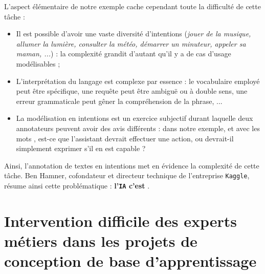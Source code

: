 		L'aspect élémentaire de notre exemple cache cependant toute la difficulté de cette tâche :
		\begin{itemize}
			\item Il est possible d'avoir une vaste diversité d'intentions (\textit{jouer de la musique, allumer la lumière, consulter la météo, démarrer un minuteur, appeler sa maman, ...}) : la complexité grandit d'autant qu'il y a de cas d'usage modélisables ;
			\item L'interprétation du langage est complexe par essence : le vocabulaire employé peut être spécifique, une requête peut être ambiguë ou à double sens, une erreur grammaticale peut gêner la compréhension de la phrase, ...
			\item La modélisation en intentions est un exercice subjectif durant laquelle deux annotateurs peuvent avoir des avis différents : dans notre exemple, et avec les mots , est-ce que l'assistant devrait effectuer une action, ou devrait-il simplement exprimer s'il en est capable ?
		\end{itemize}
		
		Ainsi, l'annotation de textes en intentions met en évidence la complexité de cette tâche.
		Ben Hamner, cofondateur et directeur technique de l'entreprise \texttt{Kaggle}, résume ainsi cette problématique : \textbf{l'\texttt{IA} c'est }.
		
		
	\section*{Intervention difficile des experts métiers dans les projets de conception de base d'apprentissage}
		

